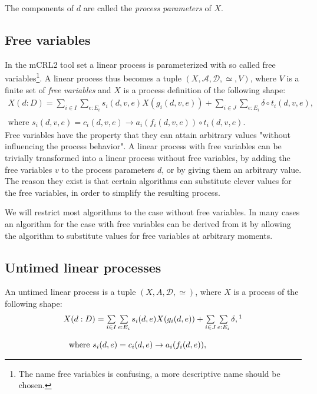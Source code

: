 \documentclass{article}
\begin{document}
The components of $d$ are called the \emph{process parameters} of $X$.

\subsection{\protect\bigskip Free variables}

\bigskip In the mCRL2 tool set a linear process is parameterized with so
called free variables\footnote{%
The name free variables is confusing, a more descriptive name should be
chosen.}. A linear process thus becomes a tuple $(X,\mathcal{A},\mathcal{D}%
,\simeq ,V)$, where $V$ is a finite set of \emph{free variables} and $X$ is
a process definition of the following shape:%
\begin{equation}
\begin{array}{l}
X(d:D)=\sum\limits_{i\in
I}\sum\limits_{e:E_{i}}s_{i}(d,v,e)X(g_{i}(d,v,e))+\sum\limits_{i\in
J}\sum\limits_{e:E_{i}}\delta \circ t_{i}(d,v,e), \\
\\
\text{where }s_{i}(d,v,e)=c_{i}(d,v,e)\rightarrow a_{i}(f_{i}(d,v,e))\circ
t_{i}(d,v,e)\text{.}%
\end{array}
\label{eq:lps_freevar}
\end{equation}%
Free variables have the property that they can attain arbitrary values
"without influencing the process behavior". A linear process with free
variables can be trivially transformed into a linear process without free
variables, by adding the free variables $v$ to the process parameters $d$,
or by giving them an arbitrary value. The reason they exist is that certain
algorithms can substitute clever values for the free variables, in order to
simplify the resulting process.

We will restrict most algorithms to the case without free variables. In many
cases an algorithm for the case with free variables can be derived from it
by allowing the algorithm to substitute values for free variables at
arbitrary moments.

\subsection{Untimed linear processes}

\bigskip An untimed linear process is a tuple $(X,A,\mathcal{D},\simeq )$,
where $X$ is a process of the following shape:%
\begin{equation}
\begin{array}{l}
X(d:D)=\sum\limits_{i\in
I}\sum\limits_{e:E_{i}}s_{i}(d,e)X(g_{i}(d,e))+\sum\limits_{i\in
J}\sum\limits_{e:E_{i}}\delta ,\QQfnmark{%
This summation over deltas looks weird.} \\
\\
\text{where }s_{i}(d,e)=c_{i}(d,e)\rightarrow a_{i}(f_{i}(d,e)),%
\end{array}%
\QQfntext{0}{
This summation over deltas looks weird.}  \label{eq:lps_untimed}
\end{equation}
\end{document}
